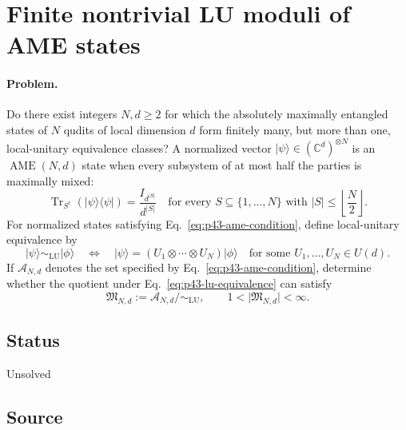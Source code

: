 \section{Finite nontrivial LU moduli of AME states}
\label{sec:problem-43}

\paragraph{Problem.}
Do there exist integers $N,d\geq 2$ for which the absolutely maximally
entangled states of $N$ qudits of local dimension $d$ form finitely many, but
more than one, local-unitary equivalence classes?  A normalized vector
$|\psi\rangle\in(\mathbb{C}^{d})^{\otimes N}$ is an $\operatorname{AME}(N,d)$
state when every subsystem of at most half the parties is maximally mixed:
\begin{equation}
  \operatorname{Tr}_{S^{c}}\!\left(|\psi\rangle\!\langle\psi|\right)
  =\frac{I_{d^{|S|}}}{d^{|S|}}
  \quad\text{for every }S\subseteq\{1,\ldots,N\}
  \text{ with }|S|\leq\left\lfloor\frac{N}{2}\right\rfloor .
  \label{eq:p43-ame-condition}
\end{equation}
For normalized states satisfying Eq.~\eqref{eq:p43-ame-condition}, define
local-unitary equivalence by
\begin{equation}
  |\psi\rangle\sim_{\mathrm{LU}}|\phi\rangle
  \quad\Longleftrightarrow\quad
  |\psi\rangle=(U_1\otimes\cdots\otimes U_N)|\phi\rangle
  \quad\text{for some }U_1,\ldots,U_N\in U(d).
  \label{eq:p43-lu-equivalence}
\end{equation}
If $\mathcal{A}_{N,d}$ denotes the set specified by
Eq.~\eqref{eq:p43-ame-condition}, determine whether the quotient under
Eq.~\eqref{eq:p43-lu-equivalence} can satisfy
\begin{equation}
  \mathfrak{M}_{N,d}:=\mathcal{A}_{N,d}/\!\sim_{\mathrm{LU}},
  \qquad
  1<\lvert\mathfrak{M}_{N,d}\rvert<\infty .
  \label{eq:p43-finite-nontrivial-moduli}
\end{equation}

\subsection*{Status}

Unsolved

\subsection*{Source}

